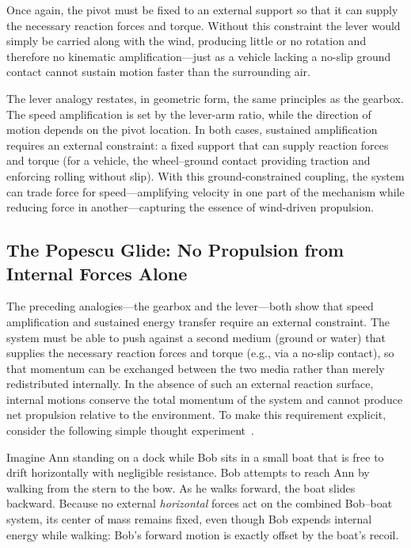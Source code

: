 \documentclass[reprint,aps,pra,longbibliography]{revtex4-2}
\begin{document}
Once again, the pivot must be fixed to an external support so that it can supply the necessary reaction forces and torque. Without this constraint the lever would simply be carried along with the wind, producing little or no rotation and therefore no kinematic amplification---just as a vehicle lacking a no-slip ground contact cannot sustain motion faster than the surrounding air.

The lever analogy restates, in geometric form, the same principles as the gearbox. The speed amplification is set by the lever-arm ratio, while the direction of motion depends on the pivot location. In both cases, sustained amplification requires an external constraint: a fixed support that can supply reaction forces and torque (for a vehicle, the wheel--ground contact providing traction and enforcing rolling without slip). With this ground-constrained coupling, the system can trade force for speed---amplifying velocity in one part of the mechanism while reducing force in another---capturing the essence of wind-driven propulsion.



\subsection{The Popescu Glide: No Propulsion from Internal Forces Alone}

The preceding analogies---the gearbox and the lever---both show that speed amplification and sustained energy transfer require an external constraint. The system must be able to push against a second medium (ground or water) that supplies the necessary reaction forces and torque (e.g., via a no-slip contact), so that momentum can be exchanged between the two media rather than merely redistributed internally. In the absence of such an external reaction surface, internal motions conserve the total momentum of the system and cannot produce net propulsion relative to the environment.
To make this requirement explicit, consider the following simple thought experiment~\cite{popescu_talk_2024}.

Imagine Ann standing on a dock while Bob sits in a small boat that is free to
drift horizontally with negligible resistance. Bob attempts to reach Ann by
walking from the stern to the bow. As he walks forward, the boat slides
backward. Because no external \emph{horizontal} forces act on the combined
Bob--boat system, its center of mass remains fixed, even though Bob expends internal energy while walking: Bob's forward motion is
exactly offset by the boat's recoil.
\end{document}
